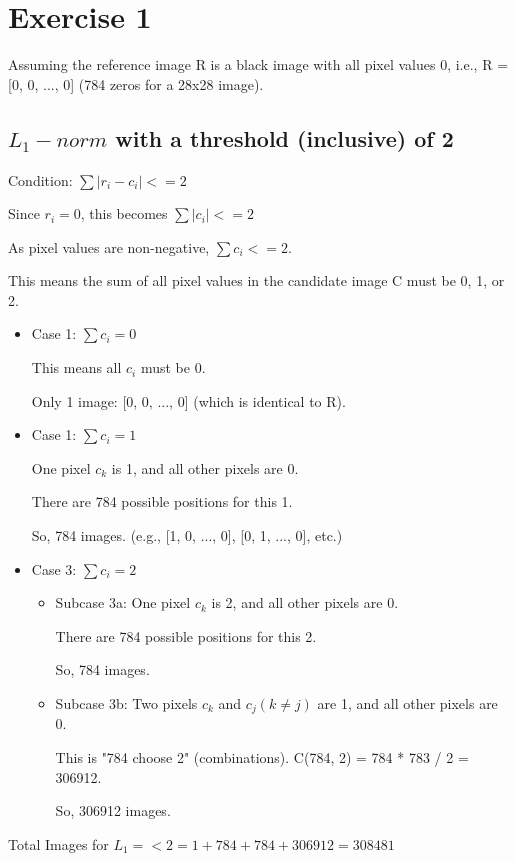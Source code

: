 \newpage

\section*{Exercise 1}

Assuming the reference image R is a black image with all pixel values 0, i.e., R = [0, 0, ..., 0] (784 zeros for a 28x28 image).

\subsection*{$L_1-norm$ with a threshold (inclusive) of 2}
Condition: $\sum |r_i - c_i| <= 2$

Since $r_i = 0$, this becomes $\sum |c_i| <= 2$

As pixel values are non-negative, $\sum c_i <= 2$.

This means the sum of all pixel values in the candidate image C must be 0, 1, or 2.
\begin{itemize}
    

    \item Case 1: $\sum c_i = 0$

        This means all $c_i$ must be 0.

        Only 1 image: [0, 0, ..., 0] (which is identical to R).

    \item Case 1: $\sum c_i = 1$

        One pixel $c_k$ is 1, and all other pixels are 0.

        There are 784 possible positions for this 1.

        So, 784 images. (e.g., [1, 0, ..., 0], [0, 1, ..., 0], etc.)

    \item Case 3: $\sum c_i = 2$
    \begin{itemize}
        \item Subcase 3a: One pixel $c_k$ is 2, and all other pixels are 0.

            There are 784 possible positions for this 2.

            So, 784 images.

        \item Subcase 3b: Two pixels $c_k$ and $c_j (k \neq j)$ are 1, and all other pixels are 0.

            This is "784 choose 2" (combinations). C(784, 2) = 784 * 783 / 2 = 306912.

            So, 306912 images.
    \end{itemize}
\end{itemize}
Total Images for $L_1 =< 2 = 1 + 784 + 784 + 306912 = 308481$

